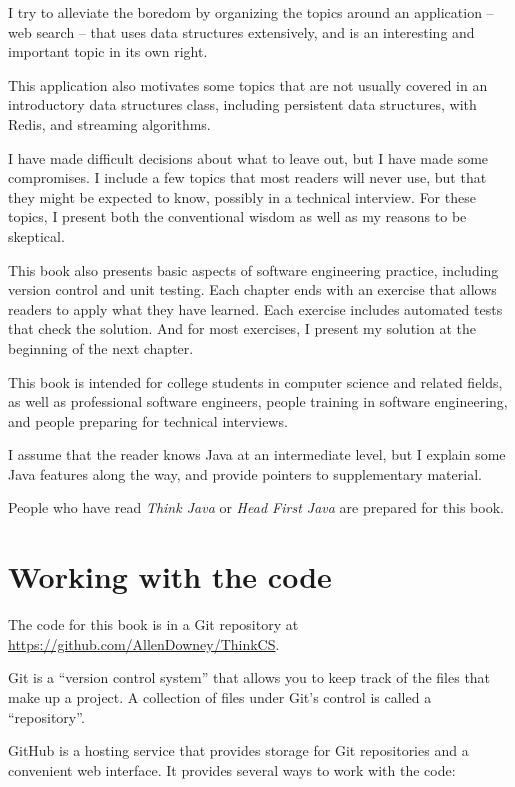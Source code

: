 \documentclass[12pt]{book}
\theoremstyle{exercise}
\begin{document}
I try to alleviate the boredom by organizing the topics around an
application -- web search -- that uses data structures extensively,
and is an interesting and important topic in its own right.

This application also motivates some topics that are not usually
covered in an introductory data structures class, including persistent
data structures, with Redis, and streaming algorithms.

I have made difficult decisions about what to leave out, but 
I have made some compromises.  I include a few topics
that most readers will never use, but that they might be expected to
know, possibly in a technical interview.  For these topics, I
present both the conventional wisdom as well as my reasons to be
skeptical. 

This book also presents basic aspects of software engineering practice,
including version control and unit testing.  Each chapter ends with
an exercise that allows readers to apply what they have learned.
Each exercise includes automated tests that check the solution.
And for most exercises, I present my solution at the beginning of
the next chapter.

This book is intended for college students in computer science and related
fields, as well as professional software engineers, people training in
software engineering, and people preparing for technical interviews.

I assume that the reader knows Java at an intermediate level,
but I explain some Java features along the way, and provide pointers
to supplementary material.

People who have read {\it Think Java} or {\it Head First
Java} are prepared for this book.


\section*{Working with the code}
\label{code}

The code for this book is in a Git repository at
\url{https://github.com/AllenDowney/ThinkCS}.

Git is a ``version control system'' that allows you to keep track of
the files that make up a project.  A collection of files under Git's
control is called a ``repository''.


GitHub is a hosting service that provides storage for Git repositories
and a convenient web interface.  It provides several ways to work with
the code:
\end{document}
